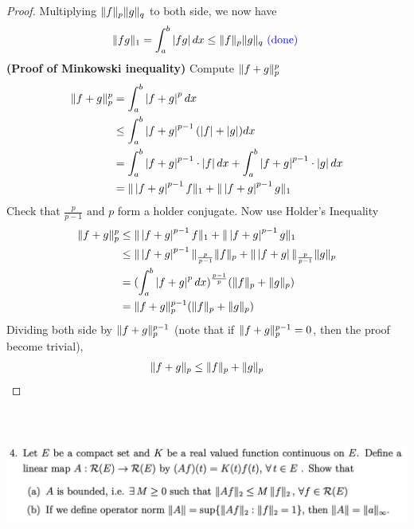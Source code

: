 \documentclass{report}
\begin{document}
\begin{proof}
Multiplying $\| f \|_p\| g \|_q$ to both side, we now have 
\begin{align*}
\| fg \|_1=\int_a^b \left|fg\right|dx\leq \| f \|_p\| g \|_q\textcolor{blue}{\text{ (done) }}
\end{align*}
\textbf{(Proof of Minkowski inequality)}
Compute $\| f+g \|_p^p$
\begin{align*}
\| f+g \|_p^p&=\int_a^b \left|f+g\right|^p dx\\
&\leq \int_a^b \left|f+g\right|^{p-1} (\left|f\right|+\left|g\right|)dx\\
&=\int_a^b \left|f+g\right|^{p-1}\cdot \left|f\right|dx+\int_a^b \left|f+g\right|^{p-1}\cdot \left|g\right|dx\\
&=\| \left|f+g\right|^{p-1}f \|_{1}+ \| \left|f+g\right|^{p-1}g \|_1
\end{align*}
Check that $\frac{p}{p-1}\text{ and }p$ form a holder conjugate. Now use Holder's Inequality 
\begin{align*}
  \| f+g \|_p^p & \leq \| \left|f+g\right|^{p-1}f \|_{1}+ \| \left|f+g\right|^{p-1}g \|_1\\
  &\leq \| \left|f+g\right|^{p-1} \|_{\frac{p}{p-1}} \| f \|_p+ \| \left|f+g\right| \|_{\frac{p}{p-1}} \| g \|_p\\
  &=(\int_a^b \left|f+g\right|^p dx)^{\frac{p-1}{p}}(\| f \|_p+\| g \|_p)\\
  &=\| f+g \|_p^{p-1}(\| f \|_p+\| g \|_p)
\end{align*}
Dividing both side by $\| f+g \|_p^{p-1}$ (note that if $\| f+g \|_p^{p-1}=0$, then the proof become trivial),  
\begin{align*}
\| f+g \|_p\leq \| f \|_p+ \| g \|_p
\end{align*}



\end{proof}
\begin{question}{}{}
\includegraphics[height=5cm,width=18cm]{ahw4q4}
\end{question}
\end{document}
